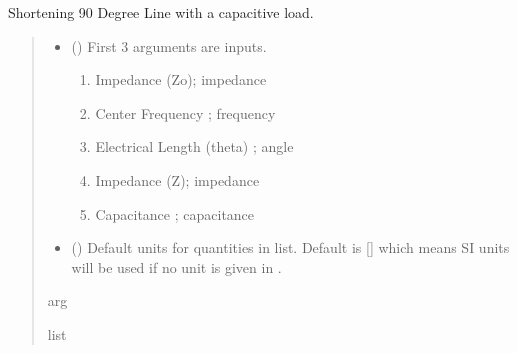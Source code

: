 \documentclass[letterpaper,10pt,english]{sphinxmanual}
\begin{document}
\begin{fulllineitems}
\label{\detokenize{components:components.Shorten90DegreeLine}}
\pysigstartsignatures
{}
\pysigstopsignatures
\sphinxAtStartPar
Shortening 90 Degree Line with a capacitive load.
\begin{quote}\begin{description}
\begin{itemize}
\item {}
\sphinxAtStartPar
{} () \textendash{}
\sphinxAtStartPar
First 3 arguments are inputs.
\begin{enumerate}
%
\item {}
\sphinxAtStartPar
Impedance (Zo); impedance

\item {}
\sphinxAtStartPar
Center Frequency ;  frequency

\item {}
\sphinxAtStartPar
Electrical Length (theta) ; angle

\item {}
\sphinxAtStartPar
Impedance (Z); impedance

\item {}
\sphinxAtStartPar
Capacitance ; capacitance

\end{enumerate}


\item {}
\sphinxAtStartPar
{} (\sphinxstyleliteralemphasis{\sphinxupquote{, }}) \textendash{} Default units for quantities in  list. Default is {[}{]} which means SI units will be used if no unit is given in .

\end{itemize}

\sphinxAtStartPar
arg

\sphinxAtStartPar
list

\end{description}\end{quote}

\end{fulllineitems}
\end{document}
